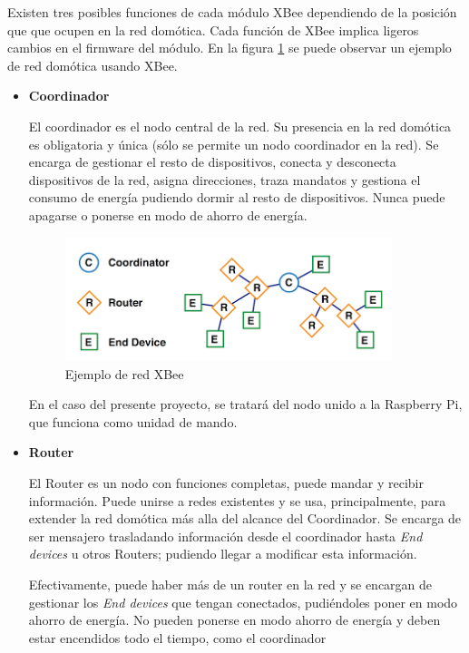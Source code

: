 Existen tres posibles funciones de cada módulo XBee dependiendo de la posición que que ocupen en la red domótica. Cada función de XBee implica ligeros cambios en el firmware del módulo. En la figura \ref{fig:XbeeRed} se puede observar un ejemplo de red domótica usando XBee.



\begin{itemize}
\item \textbf{Coordinador}

El coordinador es el nodo central de la red. Su presencia en la red domótica es obligatoria y única (sólo se permite un nodo coordinador en la red). Se encarga de gestionar el resto de dispositivos, conecta y desconecta dispositivos de la red, asigna direcciones, traza mandatos y gestiona el consumo de energía pudiendo dormir al resto de dispositivos. Nunca puede apagarse o ponerse en modo de ahorro de energía.

\begin{figure}[H]
\centering
\includegraphics[width=0.9\textwidth]{figuras/XbeeRed.png}
\caption{Ejemplo de red XBee}
\label{fig:XbeeRed}
\end{figure}

En el caso del presente proyecto, se tratará del nodo unido a la Raspberry Pi, que funciona como unidad de mando.

\item \textbf{Router}

El Router es un nodo con funciones completas, puede mandar y recibir información. Puede unirse a redes existentes y se usa, principalmente, para extender la red domótica más alla del alcance del Coordinador. Se encarga de ser mensajero trasladando información desde el coordinador hasta \textit{End devices} u otros Routers; pudiendo llegar a modificar esta información.

Efectivamente, puede haber más de un router en la red y se encargan de gestionar los \textit{End devices} que tengan conectados, pudiéndoles poner en modo ahorro de energía. No pueden ponerse en modo ahorro de energía y deben estar encendidos todo el tiempo, como el coordinador


\end{itemize}
